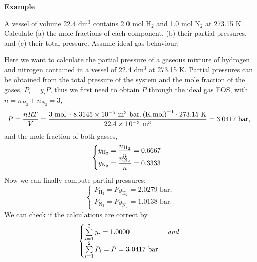    \begin{MyExample}{\begin{center}{\bf Example}\end{center}}
     \begin{example}\label{Chapter:Intro_Property_of_Gases:Example5}
       \citep{Atkins_Book} A vessel of volume 22.4 dm$^{3}$ contains 2.0 mol H$_{2}$ and 1.0 mol N$_{2}$ at 273.15 K. Calculate (a) the mole fractions of each component, (b) their partial pressures, and (c) their total pressure. Assume ideal gas behaviour.
     \end{example}

        Here we want to calculate the partial pressure of a gaseous mixture of hydrogen and nitrogen contained in a vessel of 22.4 dm$^{3}$ at 273.15 K. Partial pressures can be obtained from the total pressure of the system and the mole fraction of the gases, $P_{i}=y_{i}P$, thus we first need to obtain $P$ through the ideal gas EOS, with $n=n_{H_{2}}+n_{N_{2}}=3$,
      \begin{displaymath}
        P = \frc{n R T }{V} = \frc{3\text{ mol } \cdot 8.3145\times 10^{-5}\text{ m}^{3}\text{.bar.}\left(\text{K.mol}\right)^{-1}\cdot 273.15\text{ K}}{22.4\times 10^{-3}\text{ m}^{3}} = 3.0417\text{ bar, }
      \end{displaymath}
      and the mole fraction of both gasses,
       \begin{displaymath}
         \begin{cases}
           y_{\text{H}_{2}} = \frc{n_{\text{H}_{2}}}{n} = 0.6667  \\
           y_{\text{N}_{2}} = \frc{n_{\text{N}_{2}}}{n} = 0.3333  
         \end{cases}
       \end{displaymath}
       Now we can finally compute partial pressures:
       \begin{displaymath}
         \begin{cases}
           P_{\text{H}_{2}} = Py_{\text{H}_{2}} = 2.0279\text{ bar},  \\
           P_{\text{N}_{2}} = Py_{\text{N}_{2}} = 1.0138\text{ bar}.
         \end{cases}
       \end{displaymath}
       We can check if the calculations are correct by
       \begin{displaymath}
         \begin{cases}
           \summation[y_{i}]{i=1}{2} = 1.0000  & \textit{ and } \\
           \summation[P_{i}]{i=1}{2} = P = 3.0417\text{ bar} & \\
         \end{cases}
       \end{displaymath}
   \end{MyExample}



